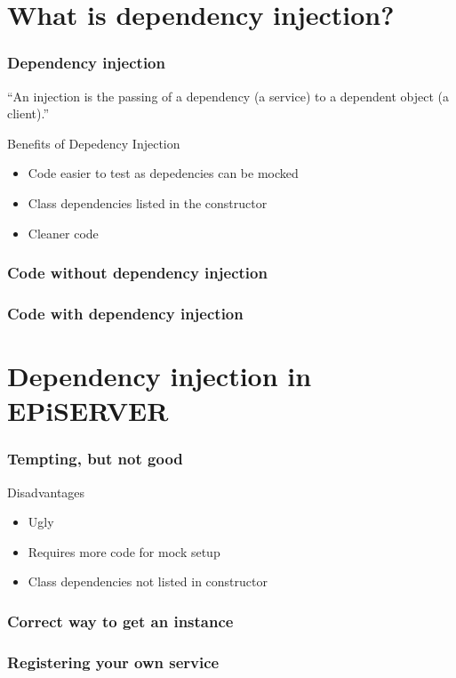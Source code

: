 \documentclass{beamer}
\begin{document}
	\section{What is dependency injection?}
		\begin{frame}
			\frametitle{Dependency injection} \pause
			\begin{exampleblock}{}
				{\large ``An injection is the passing of a dependency (a service) to a dependent object (a client).''}
				\vskip5mm
				\hspace*{} \pause
			\end{exampleblock}
			\begin{exampleblock}{Benefits of Depedency Injection} \pause
				\begin{itemize}
					\item Code easier to test as depedencies can be mocked \pause
					\item Class dependencies listed in the constructor \pause
					\item Cleaner code
				\end{itemize}
			\end{exampleblock}
		\end{frame}
		\begin{frame}
			\frametitle{Code without dependency injection}
			
		\end{frame}
		\begin{frame}
			\frametitle{Code with dependency injection}
			
		\end{frame}

	\section{Dependency injection in EPiSERVER}
		\begin{frame}
			\frametitle{Tempting, but not good}
			 \pause
			\begin{exampleblock}{Disadvantages} \pause
				\begin{itemize}
					\item Ugly \pause
					\item Requires more code for mock setup \pause
					\item Class dependencies not listed in constructor
				\end{itemize}
			\end{exampleblock}
		\end{frame}
		\begin{frame}
			\frametitle{Correct way to get an instance}
			
		\end{frame}
		\begin{frame}
			\frametitle{Registering your own service}
			
		\end{frame}
\end{document}
